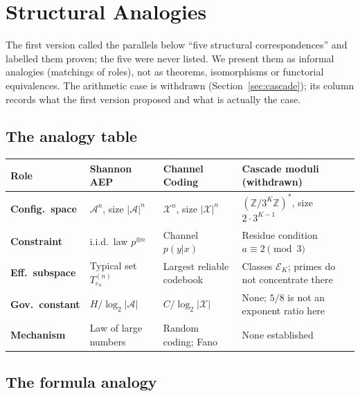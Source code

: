 \documentclass[12pt]{amsart}
\theoremstyle{plain}
\theoremstyle{definition}
\theoremstyle{remark}
\newcommand{\Z}{\mathbb{Z}}
\begin{document}
\section{Structural Analogies}
\label{sec:correspondences}

The first version called the parallels below ``five structural
correspondences'' and labelled them proven; the five were never listed. We
present them as informal analogies (matchings of roles), not as theorems,
isomorphisms or functorial equivalences. The arithmetic case is withdrawn
(Section~\ref{sec:cascade}); its column records what the first version proposed
and what is actually the case.

\subsection{The analogy table}

\medskip
\begin{center}
\begin{tabularx}{\textwidth}{>{\bfseries}lXXX}
\toprule
Role & Shannon AEP & Channel Coding & Cascade moduli (withdrawn) \\
\midrule
Config.\ space
  & $\mathcal{A}^n$, size $|\mathcal{A}|^n$
  & $\mathcal{X}^n$, size $|\mathcal{X}|^n$
  & $(\Z/3^K\Z)^*$, size $2{\cdot}3^{K-1}$ \\[4pt]
Constraint
  & i.i.d.\ law $p^{\otimes n}$
  & Channel $p(y|x)$
  & Residue condition $a \equiv 2 \pmod{3}$ \\[4pt]
Eff.\ subspace
  & Typical set $T_{\varepsilon_n}^{(n)}$
  & Largest reliable codebook
  & Classes $\mathcal{E}_K$; primes do not concentrate there \\[4pt]
Gov.\ constant
  & $H/\log_2|\mathcal{A}|$
  & $C/\log_2|\mathcal{X}|$
  & None; $5/8$ is not an exponent ratio here \\[4pt]
Mechanism
  & Law of large numbers
  & Random coding; Fano
  & None established \\
\bottomrule
\end{tabularx}
\end{center}
\medskip

\subsection{The formula analogy}
\label{sec:formula}
\end{document}

